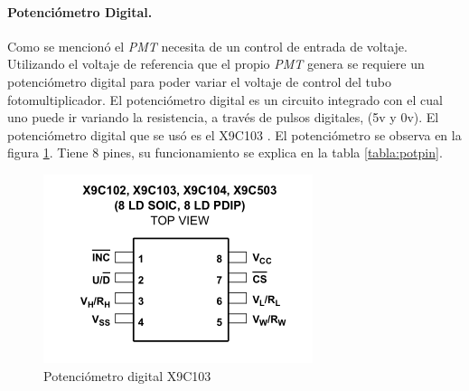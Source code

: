 \paragraph{Potenciómetro Digital.}
Como se mencionó el \textit{PMT} necesita de un control de entrada de voltaje. Utilizando el voltaje de referencia que el propio \textit{PMT} genera se requiere un potenciómetro digital para poder variar el voltaje de control del tubo fotomultiplicador. 
El potenciómetro digital es un circuito integrado con el cual uno puede ir variando la resistencia, a través de pulsos digitales, (5v y 0v). El potenciómetro digital que se usó es el X9C103 \cite{X9C102}. El potenciómetro se observa en la figura \ref{fig:potdig}. Tiene 8 pines, su funcionamiento se explica en la tabla \ref{tabla:potpin}. %
\begin{figure}[h]
	\centering
	\includegraphics[width=0.5\linewidth]{Imagenes/2/potDig}
	\caption{Potenciómetro digital X9C103 \cite{X9C102}}
	\label{fig:potdig}
\end{figure}

